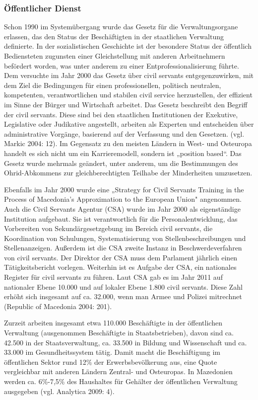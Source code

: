 \subsubsection{Öffentlicher Dienst}
Schon 1990 im Systemübergang wurde das Gesetz für die Verwaltungsorgane erlassen, das den Status der Beschäftigten in der staatlichen Verwaltung definierte. In der sozialistischen Geschichte ist der besondere Status der öffentlich Bediensteten zugunsten einer Gleichstellung mit anderen Arbeitnehmern befördert worden, was unter anderem zu einer Entprofessionalisierung führte. Dem versuchte im Jahr 2000 das Gesetz über civil servants entgegenzuwirken, mit dem Ziel die Bedingungen für einen professionellen, politisch neutralen, kompetenten, verantwortlichen und stabilen civil service herzustellen, der effizient im Sinne der Bürger und Wirtschaft arbeitet. Das Gesetz beschreibt den Begriff der civil servants. Diese sind bei den staatlichen Institutionen der Exekutive, Legislative oder Judikative angestellt, arbeiten als Experten und entscheiden über administrative Vorgänge, basierend auf der Verfassung und den Gesetzen. (vgl. Markic 2004: 12). Im Gegensatz zu den meisten Ländern in West- und Osteuropa handelt es sich nicht um ein Karrieremodell, sondern ist „position based“. Das Gesetz wurde mehrmals geändert, unter anderem, um die Bestimmungen des Ohrid-Abkommens zur gleichberechtigten Teilhabe der Minderheiten umzusetzen. \par
Ebenfalls im Jahr 2000 wurde eine „Strategy for Civil Servants Training in the Process of Macedonia's Approximation to the European Union" angenommen. Auch die Civil Servants Agentur (CSA) wurde im Jahr 2000 als eigenständige Institution aufgebaut. Sie ist verantwortlich für die Personalentwicklung, das Vorbereiten von Sekundärgesetzgebung im Bereich civil servants, die Koordination von Schulungen, Systematisierung von Stellenbeschreibungen und Stellenanzeigen. Außerdem ist die CSA zweite Instanz in Beschwerdeverfahren von civil servants. Der Direktor der CSA muss dem Parlament jährlich einen Tätigkeitsbericht vorlegen. Weiterhin ist es Aufgabe der CSA, ein nationales Register für civil servants zu führen. Laut CSA gab es im Jahr 2011 auf nationaler Ebene 10.000 und auf lokaler Ebene 1.800 civil servants. Diese Zahl erhöht sich insgesamt auf ca. 32.000, wenn man Armee und Polizei mitrechnet (Republic of Macedonia 2004: 201). \par
Zurzeit arbeiten insgesamt etwa 110.000 Beschäftigte in der öffentlichen Verwaltung (ausgenommen Beschäftigte in Staatsbetrieben), davon sind ca. 42.500 in der Staatsverwaltung, ca. 33.500 in Bildung und Wissenschaft und ca. 33.000 im Gesundheitssystem tätig. Damit macht die Beschäftigung im öffentlichen Sektor rund 12\% der Erwerbsbevölkerung aus, eine Quote vergleichbar mit anderen Ländern Zentral- und Osteuropas. In Mazedonien werden ca. 6\%-7,5\% des Haushaltes für Gehälter der öffentlichen Verwaltung ausgegeben (vgl. Analytica 2009: 4).\par

